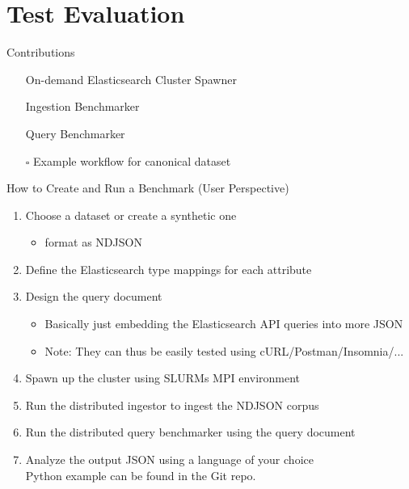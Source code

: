 \documentclass[compress,aspectratio=169]{beamer}
\newcommand{\ccheckmark}{\mbox{\ooalign{$\checkmark$\cr\hidewidth$\square$\hidewidth\cr}}}
\newcommand{\ccheckbox}{\mbox{$\square$}}
\begin{document}
	\section{Test Evaluation}
  \begin{frame}{Contributions}
    \begin{center}
      \begin{itemize}
        \item[\ccheckmark] On-demand Elasticsearch Cluster Spawner
        \item[\ccheckmark] Ingestion Benchmarker
        \item[\ccheckmark] Query Benchmarker
        \item[\ccheckbox] Example workflow for canonical dataset
      \end{itemize}
    \end{center}
  \end{frame}

  \begin{frame}{How to Create and Run a Benchmark (User Perspective)}
    \begin{enumerate}
      \item Choose a dataset or create a synthetic one
        \begin{itemize}
          \item format as NDJSON
        \end{itemize}
        \pause
      \item Define the Elasticsearch type mappings for each attribute
        \pause
      \item Design the query document
        \begin{itemize}
          \item Basically just embedding the Elasticsearch API queries into more JSON
          \item Note: They can thus be easily tested using cURL/Postman/Insomnia/...
        \end{itemize}
        \pause
      \item Spawn up the cluster using SLURMs MPI environment
        \pause
      \item Run the distributed ingestor to ingest the NDJSON corpus
        \pause
      \item Run the distributed query benchmarker using the query document
        \pause
      \item Analyze the output JSON using a language of your choice\\
        Python example can be found in the Git repo.
    \end{enumerate}
  \end{frame}
\end{document}
